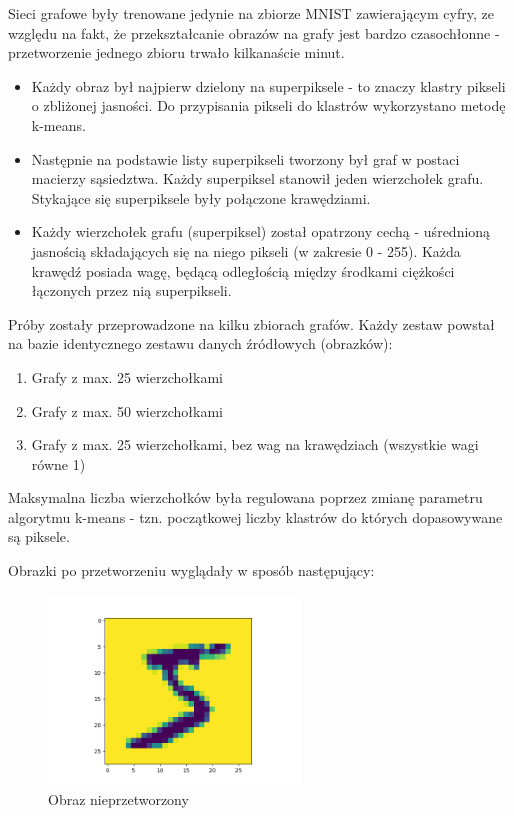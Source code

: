 \documentclass{article}
\begin{document}
Sieci grafowe były trenowane jedynie na zbiorze MNIST zawierającym cyfry,
ze względu na fakt, że przekształcanie obrazów na grafy jest bardzo czasochłonne -
przetworzenie jednego zbioru trwało kilkanaście minut.

\begin{itemize}
    \item Każdy obraz był najpierw dzielony na superpiksele - to znaczy klastry pikseli o
    zbliżonej jasności. Do przypisania pikseli do klastrów wykorzystano metodę k-means.
    \item Następnie na podstawie listy superpikseli tworzony był graf w postaci macierzy
    sąsiedztwa. Każdy superpiksel stanowił jeden wierzchołek grafu. Stykające się superpiksele
    były połączone krawędziami.
    \item Każdy wierzchołek grafu (superpiksel) został opatrzony cechą -
    uśrednioną jasnością składających się na niego pikseli (w zakresie 0 - 255).
    Każda krawędź posiada wagę, będącą odległością między środkami ciężkości
    łączonych przez nią superpikseli.
\end{itemize}

Próby zostały przeprowadzone na kilku zbiorach grafów. Każdy zestaw powstał na bazie
identycznego zestawu danych źródłowych (obrazków):

\begin{enumerate}[label=(\textbf{\Alph*})]
    \item Grafy z max. 25 wierzchołkami
    \item Grafy z max. 50 wierzchołkami
    \item Grafy z max. 25 wierzchołkami, bez wag na krawędziach (wszystkie wagi równe 1)
\end{enumerate}

Maksymalna liczba wierzchołków była regulowana poprzez zmianę parametru algorytmu k-means - tzn.
początkowej liczby klastrów do których dopasowywane są piksele.

Obrazki po przetworzeniu wyglądały w sposób następujący:
\begin{figure}[H]
    \centering
    \includegraphics[width=0.6\textwidth]{img/5Raw.png}
    \caption{Obraz nieprzetworzony}
\end{figure}
\end{document}
